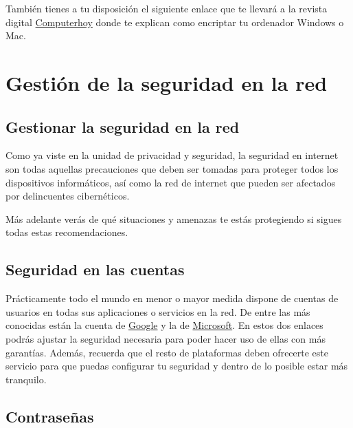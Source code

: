 \documentclass[
  spanish,
  a4paper,
  openany]{book}
\begin{document}
También tienes a tu disposición el siguiente enlace que te llevará a la revista digital \href{https://computerhoy.com/tutoriales/tecnologia/como-cifrar-disco-duro-memoria-externa-nadie-pueda-acceder-ella-386434}{Computerhoy} donde te explican como encriptar tu ordenador Windows o Mac.

\hypertarget{gestiuxf3n-de-la-seguridad-en-la-red}{%
\chapter{Gestión de la seguridad en la red}\label{gestiuxf3n-de-la-seguridad-en-la-red}}

\hypertarget{gestionar-la-seguridad-en-la-red}{%
\section{Gestionar la seguridad en la red}\label{gestionar-la-seguridad-en-la-red}}

Como ya viste en la unidad de privacidad y seguridad, la seguridad en internet son todas aquellas precauciones que deben ser tomadas para proteger todos los dispositivos informáticos, así como la red de internet que pueden ser afectados por delincuentes cibernéticos.

Más adelante verás de qué situaciones y amenazas te estás protegiendo si sigues todas estas recomendaciones.

\hypertarget{seguridad-en-las-cuentas}{%
\section{Seguridad en las cuentas}\label{seguridad-en-las-cuentas}}

Prácticamente todo el mundo en menor o mayor medida dispone de cuentas de usuarios en todas sus aplicaciones o servicios en la red. De entre las más conocidas están la cuenta de \href{https://myaccount.google.com/security}{Google} y la de \href{https://account.microsoft.com/security}{Microsoft}. En estos dos enlaces podrás ajustar la seguridad necesaria para poder hacer uso de ellas con más garantías. Además, recuerda que el resto de plataformas deben ofrecerte este servicio para que puedas configurar tu seguridad y dentro de lo posible estar más tranquilo.

\hypertarget{contraseuxf1as}{%
\section{Contraseñas}\label{contraseuxf1as}}
\end{document}
